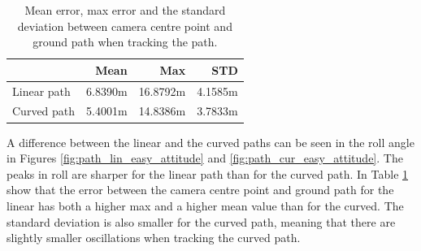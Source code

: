 \begin{table}
\centering
\begin{tabular}{l r r r}
    \hline
    & Mean & Max  & STD \\
    \hline
    Linear path & 6.8390m & 16.8792m & 4.1585m \\
    Curved path & 5.4001m & 14.8386m & 3.7833m \\
    \hline
\end{tabular}
\caption{Mean error, max error and the standard deviation between camera centre point and ground path when tracking the path.}
\label{tab:easy_path}
\end{table}

A difference between the linear and the curved paths can be seen in the roll angle in Figures \ref{fig:path_lin_easy_attitude} and \ref{fig:path_cur_easy_attitude}. The peaks in roll are sharper for the linear path than for the curved path. In Table \ref{tab:easy_path} show that the error between the camera centre point and ground path  for the linear has both a higher max and a higher mean value than for the curved. The standard deviation is also smaller for the curved path, meaning that there are slightly smaller oscillations when tracking the curved path.